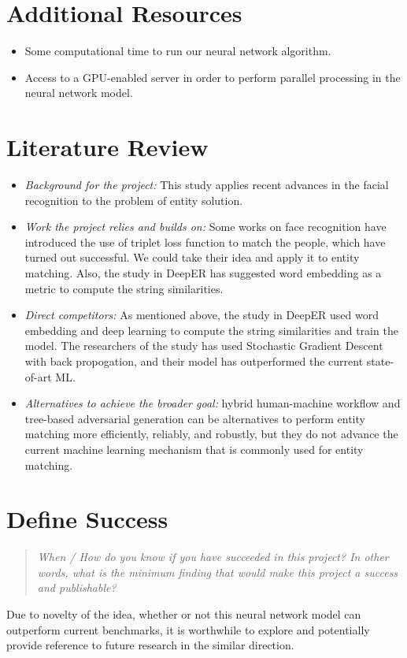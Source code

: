\documentclass{proc}
\begin{document}
\section{Additional Resources}

\begin{itemize}
  \item Some computational time to run our neural network algorithm.
  \item Access to a GPU-enabled server in order to perform parallel processing in the neural network model. 
\end{itemize}
 
\section{Literature Review}

\begin{itemize}
\item \emph{Background for the project:} This study applies recent advances in the facial recognition to the problem of entity solution.

\item \emph{Work the project relies and builds on: } Some works on face recognition have introduced the use of triplet loss function to match the people, which have turned out  successful. We could take their idea and apply it to entity matching. Also, the study in DeepER has suggested word embedding as a metric to compute the string similarities.

\item \emph{Direct competitors: } As mentioned above, the study in DeepER used word embedding and deep learning to compute the string similarities and train the model. The researchers of the study has used Stochastic Gradient Descent with back propogation, and their model has outperformed the current state-of-art ML.

\item \emph{Alternatives to achieve the broader goal: } hybrid human-machine workflow and tree-based adversarial generation can be alternatives to perform entity matching more efficiently, reliably, and robustly, but they do not advance the current machine learning mechanism that is commonly used for entity matching.

 \end{itemize}


\section{Define Success}
\begin{quote}
\emph{When / How do you know if you have succeeded in this project?
In other words, what is the minimum finding that would make this project a success and publishable?}
\end{quote}

Due to novelty of the idea, whether or not this neural network model can outperform current benchmarks, it is worthwhile to explore and potentially provide reference to future research in the similar direction.



\end{document}
